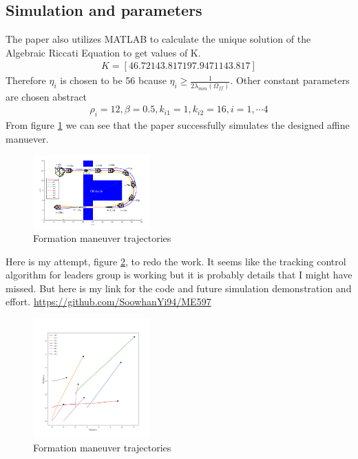 \subsection{Simulation and parameters} \label{Simulation and parameters}
 The paper also utilizes MATLAB to calculate the unique solution of the Algebraic Riccati Equation to get values of K.
 \begin{align*}
    K = [46.72 143.817 197.9471 143.817]
 \end{align*}
 Therefore $\eta_i$ is chosen to be 56 bcause $\eta_i \geq \frac{1}{2\lambda_{min}(\Omega_{ff})}$. Other constant parameters are chosen abstract
 \begin{align*}
    \rho_i = 12, \beta = 0.5, k_{i1} = 1, k_{i2} = 16, i = 1, \cdots 4
 \end{align*}
 From figure \ref{paper_simulation} we can see that the paper successfully simulates the designed affine manuever.  
 \begin{figure}[ht] 
    \centering
    \includegraphics*[width=0.4\textwidth]{./img/Paper_simulation.png}
    \caption{Formation maneuver trajectories}
    \label{paper_simulation}
 \end{figure}
  
 Here is my attempt, figure \ref{my_simulation}, to redo the work. It seems like the tracking control algorithm for leaders group is working but it is probably details that I might have missed. But here is my link for the code and future simulation demonstration and effort. \url{https://github.com/SoowhanYi94/ME597}
 \begin{figure}[ht] 
   \centering
   \includegraphics*[width=0.4\textwidth]{./img/Figure_1.png}
   \caption{Formation maneuver trajectories}
   \label{my_simulation}
\end{figure}
